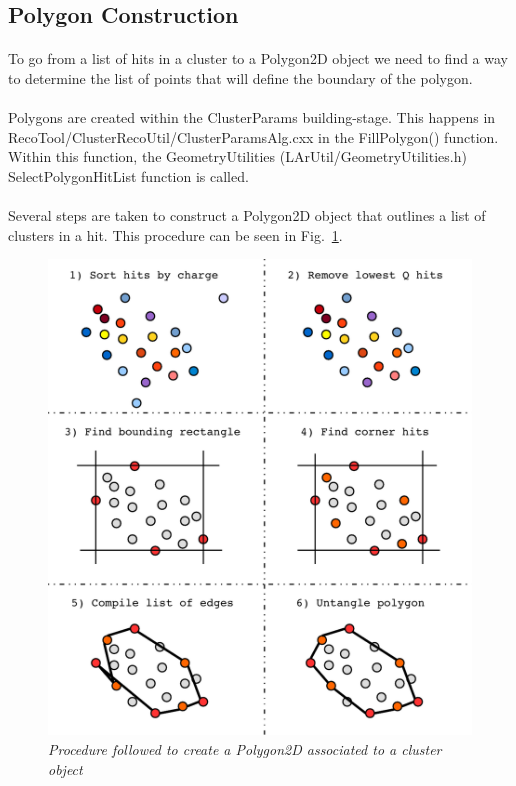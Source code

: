 \documentclass{article}
\begin{document}
\subsection{Polygon Construction}
\paragraph{}To go from a list of hits in a cluster to a Polygon2D object we need to find a
way to determine the list of points that will define the boundary of the polygon.
\paragraph{}Polygons are created within the ClusterParams building-stage. This happens in \newline
RecoTool/ClusterRecoUtil/ClusterParamsAlg.cxx in the FillPolygon() function.
Within this function, the GeometryUtilities (LArUtil/GeometryUtilities.h) SelectPolygonHitList
function is called.
\paragraph{}Several steps are taken to construct a Polygon2D object that outlines a list of clusters in a hit.
This procedure can be seen in Fig.~\ref{fig:BoundingPolygon}.
\begin{figure}[h!]
\begin{center}
\includegraphics[width=140mm]{Figures/BoundingPolygon.pdf}
\end{center}
\caption{\textit{Procedure followed to create a Polygon2D associated to a cluster object}}
\label{fig:BoundingPolygon}
\end{figure}
\end{document}
